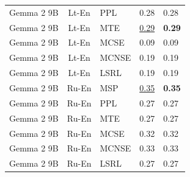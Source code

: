 \begin{table}
\begin{tabular}{lc}
Gemma 2 9B & Lt-En & PPL & 0.28 & 0.28 \\
Gemma 2 9B & Lt-En & MTE & \underline{0.29} & \textbf{0.29} \\
Gemma 2 9B & Lt-En & MCSE & 0.09 & 0.09 \\
Gemma 2 9B & Lt-En & MCNSE & 0.19 & 0.19 \\
Gemma 2 9B & Lt-En & LSRL & 0.19 & 0.19 \\
Gemma 2 9B & Ru-En & MSP & \underline{0.35} & \textbf{0.35} \\
Gemma 2 9B & Ru-En & PPL & 0.27 & 0.27 \\
Gemma 2 9B & Ru-En & MTE & 0.27 & 0.27 \\
Gemma 2 9B & Ru-En & MCSE & 0.32 & 0.32 \\
Gemma 2 9B & Ru-En & MCNSE & 0.33 & 0.33 \\
Gemma 2 9B & Ru-En & LSRL & 0.27 & 0.27 \\
\midrule
\end{tabular}
\end{table}
